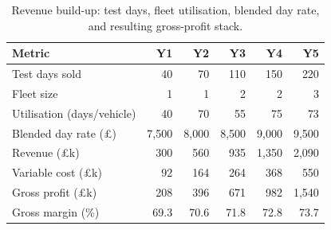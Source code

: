 \begin{table}[H]
\centering
\small
\caption{Revenue build-up: test days, fleet utilisation, blended day 
rate, and resulting gross-profit stack.}
\label{tab:revenue}
\begin{tabular}{lrrrrr}
\toprule
\textbf{Metric} & \textbf{Y1} & \textbf{Y2} & \textbf{Y3} & \textbf{Y4} & \textbf{Y5} \\
\midrule
Test days sold & 40 & 70 & 110 & 150 & 220 \\
Fleet size & 1 & 1 & 2 & 2 & 3 \\
Utilisation (days/vehicle) & 40 & 70 & 55 & 75 & 73 \\
Blended day rate (\pounds) & 7,500 & 8,000 & 8,500 & 9,000 & 9,500 \\
Revenue (\pounds k) & 300 & 560 & 935 & 1,350 & 2,090 \\
Variable cost (\pounds k) & 92 & 164 & 264 & 368 & 550 \\
Gross profit (\pounds k) & 208 & 396 & 671 & 982 & 1,540 \\
Gross margin (\%) & 69.3 & 70.6 & 71.8 & 72.8 & 73.7 \\
\bottomrule
\end{tabular}
\end{table}
